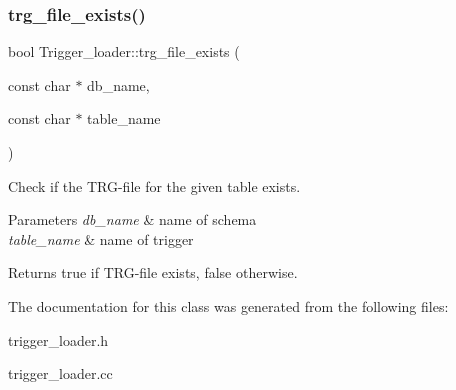 \subsubsection{\texorpdfstring{trg\+\_\+file\+\_\+exists()}{trg\_file\_exists()}}
{\footnotesize\ttfamily bool Trigger\+\_\+loader\+::trg\+\_\+file\+\_\+exists (\begin{DoxyParamCaption}\item[{const char $\ast$}]{db\+\_\+name,  }\item[{const char $\ast$}]{table\+\_\+name }\end{DoxyParamCaption})\hspace{0.3cm}{\ttfamily [static]}}

Check if the T\+RG-\/file for the given table exists.


\begin{DoxyParams}{Parameters}
{\em db\+\_\+name} & name of schema \\
\hline
{\em table\+\_\+name} & name of trigger\\
\hline
\end{DoxyParams}
\begin{DoxyReturn}{Returns}
true if T\+RG-\/file exists, false otherwise. 
\end{DoxyReturn}


The documentation for this class was generated from the following files\+:\begin{DoxyCompactItemize}
\item 
trigger\+\_\+loader.\+h\item 
trigger\+\_\+loader.\+cc\end{DoxyCompactItemize}
